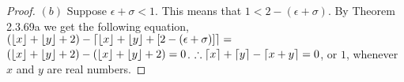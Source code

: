 \documentclass[a4paper, 12pt]{article}
\theoremstyle{plain}
\DeclarePairedDelimiter{\floor}{\lfloor}{\rfloor}
\DeclarePairedDelimiter{\ceil}{\lceil}{\rceil}
\begin{document}
\begin{proof}
		\newline
		\newline
		\indent $(b)$ Suppose $\epsilon + \sigma < 1$. This means that $1 < 2 - (\epsilon + \sigma)$. By \newline \indent Theorem 2.3.69a we get the following equation, \newline \indent $(\floor{x} + \floor{y} + 2) - \ceil{\floor{x} + \floor{y} + [2 - (\epsilon + \sigma)]} =$ \newline \indent $(\floor{x} + \floor{y} + 2) - (\floor{x} + \floor{y} + 2) = 0$.
		\newline
		\newline
		$\therefore \ceil{x} + \ceil{y} - \ceil{x + y} = 0$, or $1$, whenever $x$ and $y$ are real numbers.
	\end{proof}
\end{document}
